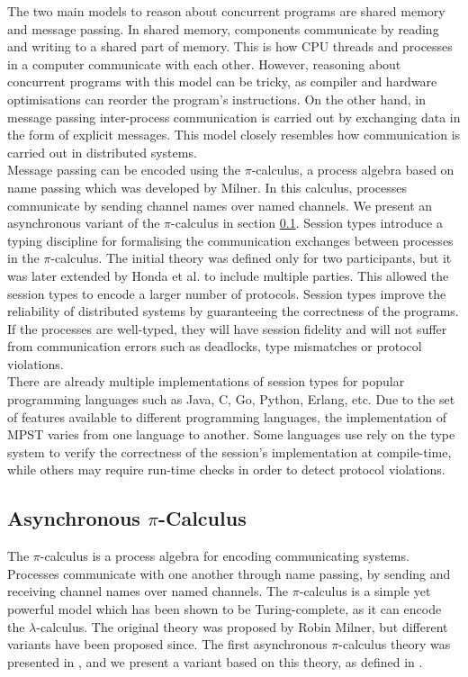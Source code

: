 \documentclass[12pt,twoside]{report}
\begin{document}
The two main models to reason about concurrent programs are shared memory and message passing. In shared memory, components communicate by reading and writing to a shared part of memory. This is how CPU threads and processes in a computer communicate with each other. However, reasoning about concurrent programs with this model can be tricky, as compiler and hardware optimisations can reorder the program's instructions\cite{sharedmemory}. On the other hand, in message passing inter-process communication is carried out by exchanging data in the form of explicit messages. This model closely resembles how communication is carried out in distributed systems.\\

Message passing can be encoded using the $\pi$-calculus, a process algebra based on name passing which was developed by Milner\cite{milnerpicalc}. In this calculus, processes communicate by sending channel names over named channels. We present an asynchronous variant of the $\pi$-calculus in section \ref{pi-calculus}. Session types\cite{binarysessiontypes1} introduce a typing discipline for formalising the communication exchanges between processes in the $\pi$-calculus. The initial theory was defined only for two participants, but it was later extended by Honda et al.\cite{asyncmpst1, asyncmpst2} to include multiple parties. This allowed the session types to encode a larger number of protocols. Session types improve the reliability of distributed systems by guaranteeing the correctness of the programs. If the processes are well-typed, they will have session fidelity and will not suffer from communication errors such as deadlocks, type mismatches or protocol violations.\\

There are already multiple implementations of session types for popular programming languages such as Java\cite{java}, C\cite{mpstc}, Go\cite{parametrictypes}, Python\cite{python}, Erlang\cite{erlang}, etc. Due to the set of features available to different programming languages, the implementation of MPST varies from one language to another. Some languages use rely on the type system to verify the correctness of the session's implementation at compile-time, while others may require run-time checks in order to detect protocol violations. 

\subsection{Asynchronous $\pi$-Calculus}\label{pi-calculus}
The $\pi$-calculus is a process algebra for encoding communicating systems. Processes communicate with one another through name passing, by sending and receiving channel names over named channels. The $\pi$-calculus is a simple yet powerful model which has been shown to be Turing-complete\cite{turingcomplete}, as it can encode the $\lambda$-calculus. The original theory was proposed by Robin Milner\cite{milnerpicalc}, but different variants have been proposed since. The first asynchronous $\pi$-calculus theory was presented in \cite{asyncandpicalc}, and we present a variant based on this theory, as defined in \cite{co406}.
\end{document}
